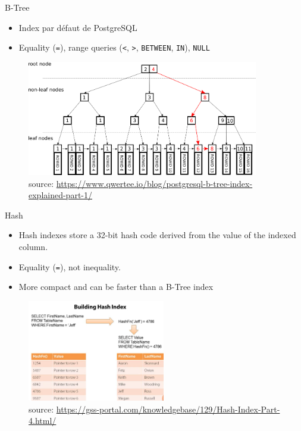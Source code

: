 \documentclass{beamer}
\begin{document}
\begin{frame}{B-Tree}
    \begin{itemize}
        \item Index par défaut de PostgreSQL
        \item Equality (\texttt{=}), range queries (\texttt{<}, \texttt{>}, \texttt{BETWEEN}, \texttt{IN}), \texttt{NULL}
    \end{itemize}
    \begin{figure}[b]
        \includegraphics[width=0.9\textwidth]{Images/index_lookup.png}
        \caption{source: \href{https://www.qwertee.io/blog/postgresql-b-tree-index-explained-part-1/}{https://www.qwertee.io/blog/postgresql-b-tree-index-explained-part-1/}}
    \end{figure}
\end{frame}

\begin{frame}{Hash}
    \begin{itemize}
        \item Hash indexes store a 32-bit hash code derived from the value of the indexed column.
        \item Equality (\texttt{=}), not inequality.
        \item More compact and can be faster than a B-Tree index
    \end{itemize}

    \begin{figure}[b]
        \includegraphics[width=6cm]{Images/hash_index.png}
        \caption{source: \href{https://gss-portal.com/knowledgebase/129/Hash-Index-Part-4.html/}{https://gss-portal.com/knowledgebase/129/Hash-Index-Part-4.html/}}
    \end{figure}
\end{frame}
\end{document}
